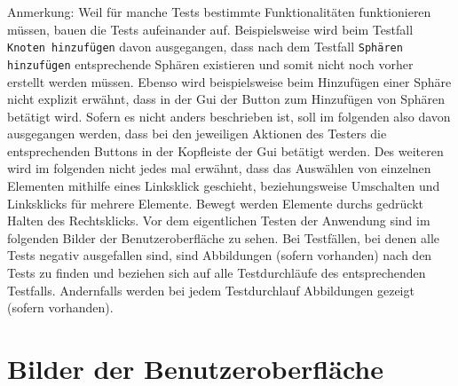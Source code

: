 \documentclass[enabledeprecatedfontcommands]{scrartcl}
\begin{document}
	
\newpage
Anmerkung: Weil für manche Tests bestimmte Funktionalitäten funktionieren müssen, bauen die Tests aufeinander auf. Beispielsweise wird beim Testfall \texttt{Knoten hinzufügen} davon ausgegangen, dass nach dem Testfall \texttt{Sphären hinzufügen} entsprechende Sphären existieren und somit nicht noch vorher erstellt werden müssen. Ebenso wird beispielsweise beim Hinzufügen einer Sphäre nicht explizit erwähnt, dass in der Gui der Button zum Hinzufügen von Sphären betätigt wird. Sofern es nicht anders beschrieben ist, soll im folgenden also davon ausgegangen werden, dass bei den jeweiligen Aktionen des Testers die entsprechenden Buttons in der Kopfleiste der Gui betätigt werden. Des weiteren wird im folgenden nicht jedes mal erwähnt, dass das Auswählen von einzelnen Elementen mithilfe eines Linksklick geschieht, beziehungsweise Umschalten und Linksklicks für mehrere Elemente. Bewegt werden Elemente durchs gedrückt Halten des Rechtsklicks. Vor dem eigentlichen Testen der Anwendung sind im folgenden Bilder der Benutzeroberfläche zu sehen. Bei Testfällen, bei denen alle Tests negativ ausgefallen sind, sind Abbildungen (sofern vorhanden) nach den Tests zu finden und beziehen sich auf alle Testdurchläufe des entsprechenden Testfalls. Andernfalls werden bei jedem Testdurchlauf Abbildungen gezeigt (sofern vorhanden).  \\

\newpage

\thispagestyle{fancy}
\fancyhead{}

\fancyfoot{}
\renewcommand{\headrulewidth}{0.4pt}
\tableofcontents

\newpage


\section{Bilder der Benutzeroberfläche}
\end{document}

